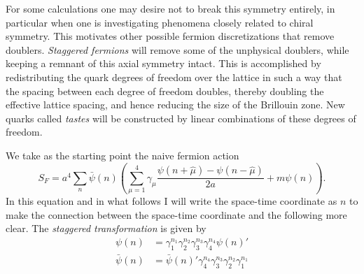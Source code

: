 For some calculations one may desire not to break this symmetry entirely,
in particular when one is investigating phenomena closely related to
chiral symmetry. This motivates other possible fermion discretizations
that remove doublers. {\it Staggered fermions} will remove some of the 
unphysical doublers, while keeping a remnant of this axial symmetry intact. 
This is accomplished by redistributing the quark degrees of freedom over
the lattice in such a way that the spacing between each degree of freedom
doubles, thereby doubling the effective lattice spacing, and hence
reducing the size of the Brillouin zone. New quarks called {\it tastes}
will be constructed by linear combinations of these degrees of freedom.

We take as the starting point the naive fermion action
\begin{equation}
 S_F
     =a^4\sum_n\bar{\psi}(n)\left(\sum_{\mu=1}^4\gamma_\mu
       \frac{\psi(n+\hat{\mu})-\psi(n-\hat{\mu})}{2a}
       +m\psi(n)\right).
\end{equation}
In this equation and in what follows I will write the space-time coordinate
as $n$ to make the connection between the space-time coordinate and the
following more clear. The {\it staggered
transformation} is given by
\begin{equation}\begin{aligned}
\psi(n)&=\gamma_1^{n_1}\gamma_2^{n_2}\gamma_3^{n_3}\gamma_4^{n_4}\psi(n)'\\
\bar{\psi}(n)
   &=\bar{\psi}(n)'\gamma_4^{n_4}\gamma_3^{n_3}\gamma_2^{n_2}\gamma_1^{n_1}
\end{aligned}\end{equation}

